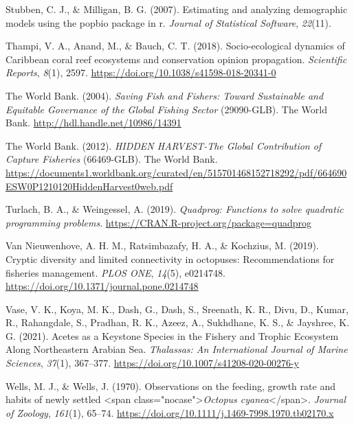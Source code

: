 \documentclass[
]{article}
\newlength{\cslhangindent}
\newlength{\cslentryspacingunit} %
\newenvironment{CSLReferences}[2] %
 {%
  \setlength{\parindent}{0pt}
  \ifodd #1
  \let\oldpar\par
  \def\par{\hangindent=\cslhangindent\oldpar}
  \fi
  \setlength{\parskip}{#2\cslentryspacingunit}
 }%
 {}
\begin{document}
\begin{CSLReferences}{1}{0}
\leavevmode{}%
Stubben, C. J., \& Milligan, B. G. (2007). Estimating and analyzing demographic models using the popbio package in r. \emph{Journal of Statistical Software}, \emph{22}(11).

\leavevmode{}%
Thampi, V. A., Anand, M., \& Bauch, C. T. (2018). Socio-ecological dynamics of {Caribbean} coral reef ecosystems and conservation opinion propagation. \emph{Scientific Reports}, \emph{8}(1), 2597. \url{https://doi.org/10.1038/s41598-018-20341-0}

\leavevmode{}%
The World Bank. (2004). \emph{Saving {Fish} and {Fishers}: {Toward} {Sustainable} and {Equitable} {Governance} of the {Global} {Fishing} {Sector}} (29090-GLB). The World Bank. \url{http://hdl.handle.net/10986/14391}

\leavevmode{}%
The World Bank. (2012). \emph{{HIDDEN} {HARVEST}-{The} {Global} {Contribution} of {Capture} {Fisheries}} (66469-GLB). The World Bank. \url{https://documents1.worldbank.org/curated/en/515701468152718292/pdf/664690ESW0P1210120HiddenHarvest0web.pdf}

\leavevmode{}%
Turlach, B. A., \& Weingessel, A. (2019). \emph{Quadprog: Functions to solve quadratic programming problems}. \url{https://CRAN.R-project.org/package=quadprog}

\leavevmode{}%
Van Nieuwenhove, A. H. M., Ratsimbazafy, H. A., \& Kochzius, M. (2019). Cryptic diversity and limited connectivity in octopuses: {Recommendations} for fisheries management. \emph{PLOS ONE}, \emph{14}(5), e0214748. \url{https://doi.org/10.1371/journal.pone.0214748}

\leavevmode{}%
Vase, V. K., Koya, M. K., Dash, G., Dash, S., Sreenath, K. R., Divu, D., Kumar, R., Rahangdale, S., Pradhan, R. K., Azeez, A., Sukhdhane, K. S., \& Jayshree, K. G. (2021). Acetes as a {Keystone} {Species} in the {Fishery} and {Trophic} {Ecosystem} {Along} {Northeastern} {Arabian} {Sea}. \emph{Thalassas: An International Journal of Marine Sciences}, \emph{37}(1), 367--377. \url{https://doi.org/10.1007/s41208-020-00276-y}

\leavevmode{}%
Wells, M. J., \& Wells, J. (1970). Observations on the feeding, growth rate and habits of newly settled {\textless{}}span class="nocase"{\textgreater{}}\emph{{Octopus} cyanea}{\textless{}}/span{\textgreater{}}. \emph{Journal of Zoology}, \emph{161}(1), 65--74. \url{https://doi.org/10.1111/j.1469-7998.1970.tb02170.x}


\end{CSLReferences}
\end{document}
